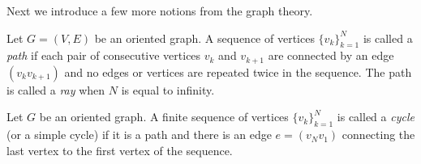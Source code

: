 \documentclass[12pt,oneside,a4paper]{amsart}
\begin{document}
    Next we introduce a few more notions from the graph theory.
    \begin{definition}
      Let $G = (V, E)$ be an oriented graph.
      A sequence of vertices $\{v_k\}_{k=1}^N$ is called a \emph{path} if each pair of consecutive vertices
        $v_k$ and $v_{k+1}$ are connected by an edge $(v_k v_{k+1})$ and no edges or vertices are repeated twice in the sequence.
      The path is called a \emph{ray} when $N$ is equal to infinity.
    \end{definition}
    \begin{definition}
      Let $G$ be an oriented graph.
      A finite sequence of vertices $\{v_k\}_{k=1}^N$ is called a \emph{cycle} (or a simple cycle) if it is
        a path and there is an edge $e = (v_N v_1)$ connecting the last vertex to the first vertex of the sequence.
    \end{definition}
\end{document}
